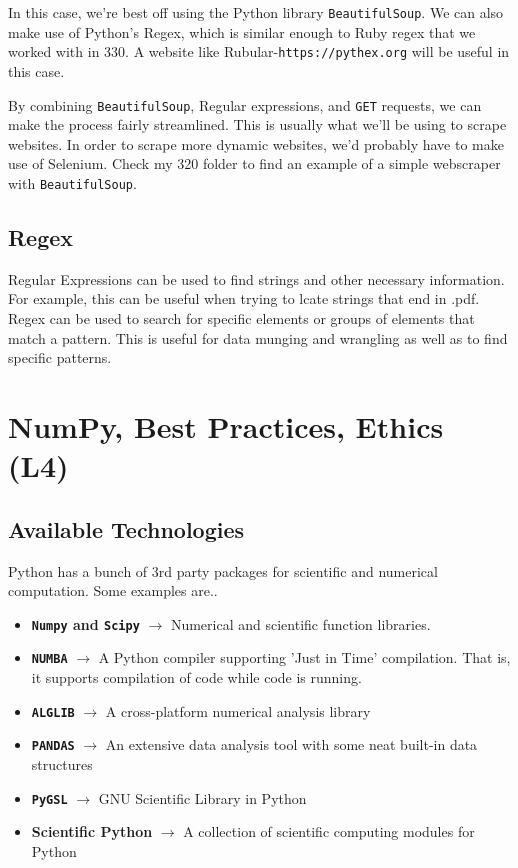 \documentclass[english, 10pt]{article}
\begin{document}
In this case, we're best off using the Python library \texttt{BeautifulSoup}. We can also make use of Python's Regex, which is similar enough to Ruby regex that we worked with in 330. A website like Rubular-\texttt{https://pythex.org} will be useful in this case.\newline

By combining \texttt{BeautifulSoup}, Regular expressions, and \texttt{GET} requests, we can make the process fairly streamlined. This is usually what we'll be using to scrape websites. In order to scrape more dynamic websites, we'd probably have to make use of Selenium. Check my 320 folder to find an example of a simple webscraper with \texttt{BeautifulSoup}.

\subsection{Regex}
Regular Expressions can be used to find strings and other necessary information. For example, this can be useful when trying to lcate strings that end in .pdf. Regex can be used to search for specific elements or groups of elements that match a pattern. This is useful for data munging and wrangling as well as to find specific patterns. 
\section{NumPy, Best Practices, Ethics (L4)}

\subsection{Available Technologies}

Python has a bunch of 3rd party packages for scientific and numerical computation. Some examples are..

\begin{itemize}
	\item \textbf{\texttt{Numpy} and \texttt{Scipy}} $\rightarrow$ Numerical and scientific function libraries.
	\item \textbf{\texttt{NUMBA}} $\rightarrow$ A Python compiler supporting 'Just in Time' compilation. That is, it supports compilation of code while code is running.
	\item \textbf{\texttt{ALGLIB}} $\rightarrow$ A cross-platform numerical analysis library
	\item \textbf{\texttt{PANDAS}} $\rightarrow$ An extensive data analysis tool with some neat built-in data structures
	\item \textbf{\texttt{PyGSL}} $\rightarrow$ GNU Scientific Library in Python
	\item \textbf{Scientific Python} $\rightarrow$ A collection of scientific computing modules for Python
\end{itemize}
\end{document}
